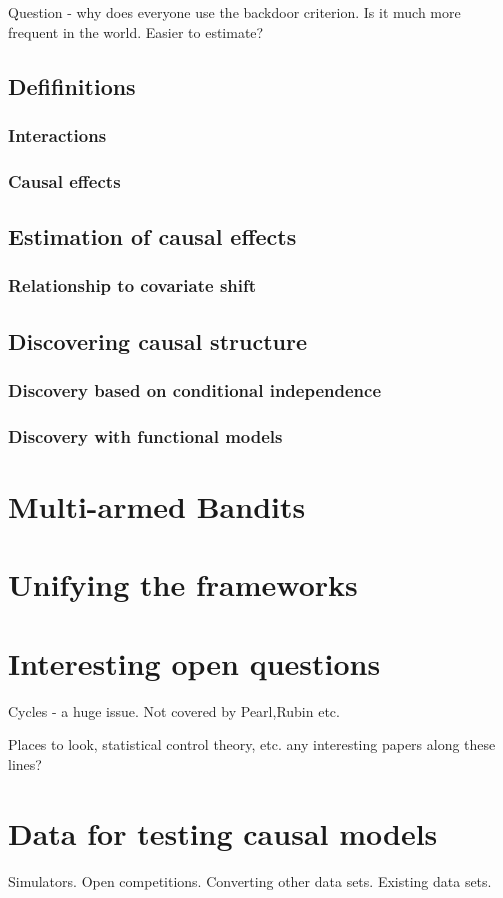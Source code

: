 \documentclass[11pt,a4paper]{article}
\begin{document}
Question - why does everyone use the backdoor criterion. Is it much more frequent in the world. Easier to estimate? 

\subsection*{Defifinitions}
\subsubsection*{Interactions}
\subsubsection*{Causal effects}

\subsection*{Estimation of causal effects}

\subsubsection*{Relationship to covariate shift}


\subsection*{Discovering causal structure}

\subsubsection*{Discovery based on conditional independence}

\subsubsection*{Discovery with functional models}

\section*{Multi-armed Bandits}

\section*{Unifying the frameworks}
\label{sec:unificaition}

\section*{Interesting open questions}
Cycles - a huge issue. Not covered by Pearl,Rubin etc. 

Places to look, statistical control theory, etc. any interesting papers along these lines?

\section*{Data for testing causal models}
Simulators. Open competitions. Converting other data sets. Existing data sets.


\end{document}

